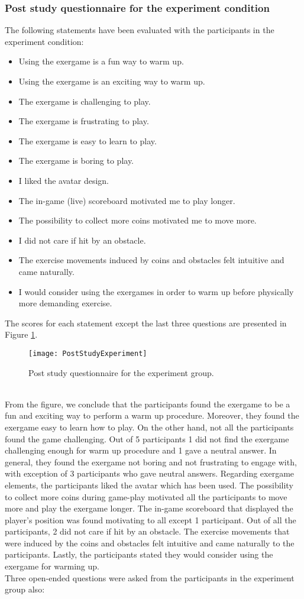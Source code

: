 \subsubsection{Post study questionnaire for the experiment condition} 
The following statements have been evaluated with the participants in the experiment condition:
\begin{itemize}
 \item Using the exergame is a fun way to warm up.
 \item  Using the exergame is an exciting way to warm up.
 \item  The exergame is challenging to play.
 \item  The exergame is frustrating to play.
 \item  The exergame is easy to learn to play.
  \item The exergame is boring to play.
  \item I liked the avatar design.
  \item The in-game (live) scoreboard motivated me to play longer.
  \item The possibility to collect more coins motivated me to move more.
 \item  I did not care if hit by an obstacle. 
 \item  The exercise movements induced by coins and obstacles felt intuitive and came naturally. 
 \item I would consider using the exergames in order to warm up before physically more demanding exercise.
\end{itemize}
The scores for each statement except the last three questions are presented in Figure \ref{fig:poststudyexperiment}.\\
\begin{figure}[h]
    \centering
    \texttt{[image: PostStudyExperiment]}
    \caption{Post study questionnaire for the experiment group.}
    \label{fig:poststudyexperiment}
\end{figure}\\
From the figure, we conclude that the participants found the exergame to be a fun and exciting way to perform a warm up procedure. Moreover, they found the exergame easy to learn how to play. On the other hand, not all the participants found the game challenging. Out of 5 participants 1 did not find the exergame challenging enough for warm up procedure and 1 gave a neutral answer. In general, they found the exergame not boring and not frustrating to engage with, with exception of 3 participants who gave neutral answers.  Regarding exergame elements, the participants liked the avatar which has been used. The possibility to collect more coins during game-play motivated all the participants to move more and play the exergame longer. The in-game scoreboard that displayed the player's position was found motivating to all except 1 participant. Out of all the participants, 2 did not care if hit by an obstacle. The exercise movements that were induced by the coins and obstacles felt intuitive and came naturally to the participants.  Lastly, the participants stated they would consider using the exergame for warming up. \\Three open-ended questions were asked from the participants in the experiment group also:
